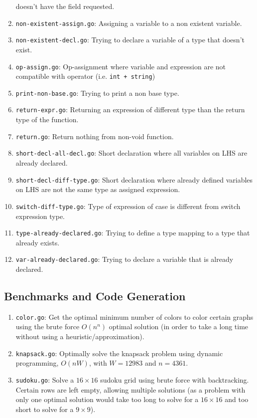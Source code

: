 \documentclass[11pt]{article}
\begin{document}
\begin{enumerate}
  doesn't have the field requested.
\item \texttt{non-existent-assign.go}: Assigning a variable to a non
  existent variable.
\item \texttt{non-existent-decl.go}: Trying to declare a variable of
  a type that doesn't exist.
\item \texttt{op-assign.go}: Op-assignment where variable and
  expression are not compatible with operator (i.e. \texttt{int +
  string})
\item \texttt{print-non-base.go}: Trying to print a non base type.
\item \texttt{return-expr.go}: Returning an expression of different
  type than the return type of the function.
\item \texttt{return.go}: Return nothing from non-void function.
\item \texttt{short-decl-all-decl.go}: Short declaration where all
  variables on LHS are already declared.
\item \texttt{short-decl-diff-type.go}: Short declaration where
  already defined variables on LHS are not the same type as assigned
  expression.
\item \texttt{switch-diff-type.go}: Type of expression of case is
  different from switch expression type.
\item \texttt{type-already-declared.go}: Trying to define a type
  mapping to a type that already exists.
\item \texttt{var-already-declared.go}: Trying to declare a variable
  that is already declared.
\end{enumerate}

\subsection{Benchmarks and Code Generation}

\begin{enumerate}
\item \texttt{color.go}: Get the optimal minimum number of colors to
color certain graphs using the brute force $O(n^n)$ optimal solution
(in order to take a long time without using a
heuristic/approximation).
\item \texttt{knapsack.go}: Optimally solve the knapsack problem using
  dynamic programming, $O(nW)$, with $W = 12983$ and $n = 4361$.
\item \texttt{sudoku.go}: Solve a $16 \times 16$ sudoku grid using
  brute force with backtracking. Certain rows are left empty, allowing
  multiple solutions (as a problem with only one optimal solution
  would take too long to solve for a $16 \times 16$ and too short to
  solve for a $9 \times 9$).
\end{enumerate}
\end{document}
